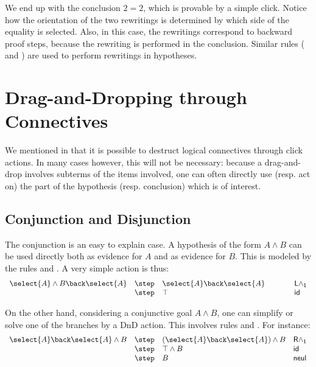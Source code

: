 We end up with the conclusion $2 = 2$, which is provable by a simple click.
Notice how the orientation of the two rewritings is determined by which side of
the equality is selected. Also, in this case, the rewritings
correspond to backward proof steps, because the rewriting is performed
in the conclusion. Similar rules ( and ) are
used to perform rewritings in hypotheses.


\section{Drag-and-Dropping through Connectives}
We mentioned in  that it is possible to destruct logical
connectives through click actions. In many cases however, this will not be
necessary: because a drag-and-drop involves subterms of the items involved, one
can often directly use (resp. act on) the part of the hypothesis (resp.
conclusion) which is of interest.

\subsection{Conjunction and Disjunction}
The conjunction is an easy to explain case. A hypothesis of the form
$A\land B$ can be used directly both as evidence for $A$ and as evidence
for $B$. This is modeled by the rules  and
. A very simple action is thus:
$$
\begin{array}{llll}
  \select{A}\land B \back \select{A} & \step& \select{A} \back
  \select{A} \hbox to 1cm {\hfil}&\mathsf{L \land_1}\\
                                       & \step &\top & \mathsf{id}
\end{array}
$$

On the other hand, considering a conjunctive goal $A\land B$, one can
simplify or solve one of the branches by a DnD action. This involves
rules  and
. For instance:
$$
\begin{array}{llll}
  \select{A} \back \select{A}\land B &
                                         \step& (\select{A} \back
                                         \select{A})\land B &\mathsf{R \land_1}\\
                                       & \step& \top \land B  & \mathsf{id}\\
  &\step& B&\mathsf{neul}
\end{array}
$$


